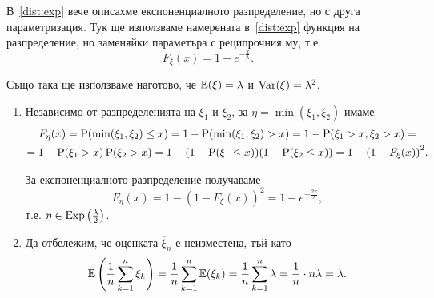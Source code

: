 \documentclass[numbers=endperiod, DIV=15, bibliography=totocnumbered]{scrartcl}
\begin{document}
\begin{solution}
  В~\ref{dist:exp} вече описахме експоненциалното разпределение, но с друга параметризация. Тук ще използваме намерената в~\ref{dist:exp} функция на разпределение, но заменяйки параметъра с реципрочния му, т.е.
  \begin{displaymath}
    F_\xi(x) = 1 - e^{-\frac x \lambda}.
  \end{displaymath}

  Също така ще използваме наготово, че $\mathbb{E}(\xi) = \lambda$ и $\operatorname{Var}(\xi) = \lambda^2$.

  \begin{enumerate}[label=\alph*)]
    \item Независимо от разпределенията на $\xi_1$ и $\xi_2$, за $\eta = \min(\xi_1, \xi_2)$ имаме
    \begin{multline*}
      F_\eta(x)
      =
      \operatorname{P}(\min(\xi_1, \xi_2) \leq x)
      =
      1 - \operatorname{P}(\min(\xi_1, \xi_2) > x)
      =
      1 - \operatorname{P}(\xi_1 > x, \xi_2 > x)
      = \\ =
      1 - \operatorname{P}(\xi_1 > x) \operatorname{P}(\xi_2 > x)
      =
      1 - (1 - \operatorname{P}(\xi_1 \leq x)) (1 - \operatorname{P}(\xi_2 \leq x))
      =
      1 - {(1 - F_\xi(x))}^2.
    \end{multline*}

    За експоненциалното разпределение получаваме
    \begin{displaymath}
      F_\eta(x)
      =
      1 - {(1 - F_\xi(x))}^2
      =
      1 - e^{- \frac {2 x} \lambda},
    \end{displaymath}
    т.е. $\eta \in \operatorname{Exp}\left(\frac \lambda 2 \right)$.

    \item Да отбележим, че оценката $\overline \xi_n$ е неизместена, тъй като
    \begin{displaymath}
      \mathbb{E}\left( \frac 1 n \sum_{k=1}^n \xi_k \right)
      =
      \frac 1 n \sum_{k=1}^n \mathbb{E}(\xi_k)
      =
      \frac 1 n \sum_{k=1}^n \lambda
      =
      \frac 1 n \cdot n \lambda
      =
      \lambda.
    \end{displaymath}


\end{enumerate}
\end{solution}
\end{document}
